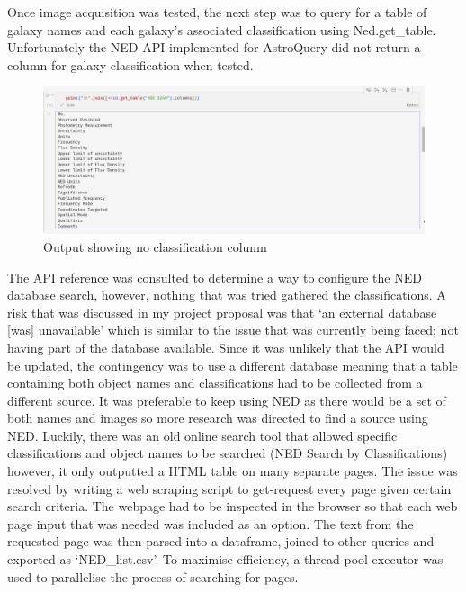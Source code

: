 \documentclass[12pt,runningheads]{llncs}
\begin{document}
\noindent Once image acquisition was tested, the next step was to query for a table of galaxy
names and each galaxy's associated classification using Ned.get\_table. Unfortunately
the NED API implemented for AstroQuery did not return a column for galaxy classification 
when tested. 

\begin{figure}[h]
    \includegraphics[scale=0.3]{Screenshot_2024-01-31_23-37-59.png}
    \centering
    \caption{Output showing no classification column}\label{tab1}
\end{figure}

\noindent The API reference was consulted to determine a way to configure the NED database search,
however, nothing that was tried gathered the classifications. A risk that was discussed
in my project proposal was that ‘an external database [was] unavailable’ which is similar
to the issue that was currently being faced; not having part of the database available.
Since it was unlikely that the API would be updated, the contingency was to use a different
database meaning that a table containing both object names and classifications had to be
collected from a different source. It was preferable to keep using NED as there would
be a set of both names and images so more research was directed to find a source using
NED. Luckily, there was an old online search tool that allowed specific classifications
and object names to be searched (NED Search by Classifications) however, it only outputted
a HTML table on many separate pages. The issue was resolved by writing a web scraping
script to get-request every page given certain search criteria. The webpage had to be
inspected in the browser so that each web page input that was needed was included as an 
option. The text from the requested page was then parsed into a dataframe, joined to other
queries and exported as ‘NED\_list.csv’. To maximise efficiency, a thread pool executor was
used to parallelise the process of searching for pages.
\end{document}
